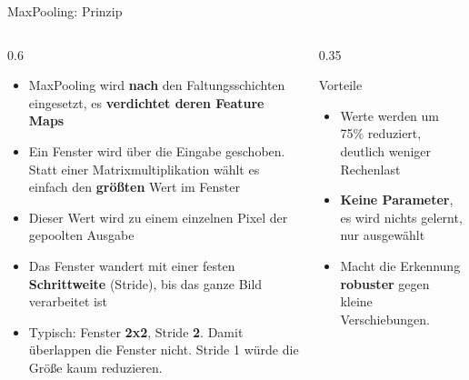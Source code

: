 \begin{frame}{MaxPooling: Prinzip}
\footnotesize
\begin{columns}
\begin{column}{0.6\linewidth}
\begin{itemize}
  \item MaxPooling wird \textbf{nach} den Faltungsschichten eingesetzt, es \textbf{verdichtet deren Feature Maps}
  \item Ein Fenster wird über die Eingabe geschoben. Statt einer Matrixmultiplikation wählt es einfach den \textbf{größten} Wert im Fenster
  \item Dieser Wert wird zu einem einzelnen Pixel der gepoolten Ausgabe
  \item Das Fenster wandert mit einer festen \textbf{Schrittweite} (Stride), bis das ganze Bild verarbeitet ist
  \item Typisch: Fenster \textbf{2x2}, Stride \textbf{2}. Damit überlappen die Fenster nicht. Stride 1 würde die Größe kaum reduzieren.
\end{itemize}
\end{column}
\begin{column}{0.35\linewidth}
\begin{block}{\footnotesize Vorteile}
\begin{itemize}
  \item Werte werden um 75\% reduziert, deutlich weniger Rechenlast
  \item \textbf{Keine Parameter}, es wird nichts gelernt, nur ausgewählt
  \item Macht die Erkennung \textbf{robuster} gegen kleine Verschiebungen.
\end{itemize}
\end{block}
\end{column}
\end{columns}
\end{frame}

